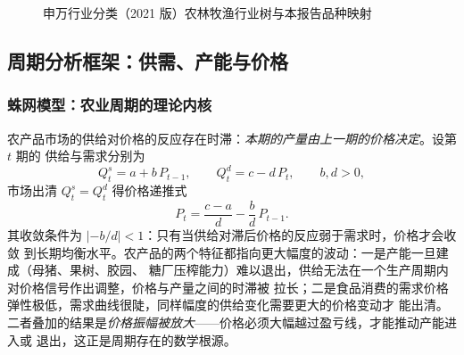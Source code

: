 \begin{figure}[htbp]
\caption{申万行业分类（2021 版）农林牧渔行业树与本报告品种映射}
\label{fig:sw-tree}
\end{figure}

\subsection{周期分析框架：供需、产能与价格}
\label{sec:fw-framework}

\subsubsection{蛛网模型：农业周期的理论内核}

农产品市场的供给对价格的反应存在时滞：\emph{本期的产量由上一期的价格决定}。设第 $t$ 期的
供给与需求分别为
\begin{equation}
Q_t^{s} = a + b\,P_{t-1}, \qquad Q_t^{d} = c - d\,P_t, \qquad b, d > 0,
\label{eq:cobweb}
\end{equation}
市场出清 $Q_t^{s}=Q_t^{d}$ 得价格递推式
\begin{equation}
P_t = \frac{c-a}{d} - \frac{b}{d}\,P_{t-1}.
\end{equation}
其收敛条件为 $\left| -b/d \right| < 1$：只有当供给对滞后价格的反应弱于需求时，价格才会收敛
到长期均衡水平。农产品的两个特征都指向更大幅度的波动：一是产能一旦建成（母猪、果树、胶园、
糖厂压榨能力）难以退出，供给无法在一个生产周期内对价格信号作出调整，价格与产量之间的时滞被
拉长；二是食品消费的需求价格弹性极低，需求曲线很陡，同样幅度的供给变化需要更大的价格变动才
能出清。二者叠加的结果是\emph{价格振幅被放大}——价格必须大幅越过盈亏线，才能推动产能进入或
退出，这正是周期存在的数学根源。

